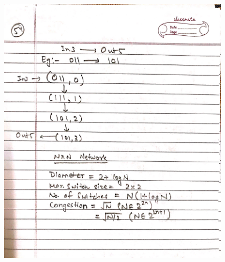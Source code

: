 \begin{figure}[H]
    \centering
    \includegraphics[width=16cm, height=21cm]{"./MIT-6.042J/MIT-6042J-054"}
\end{figure}
\newpage
